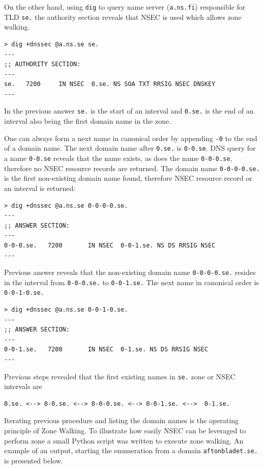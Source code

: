 On the other hand, using \texttt{dig} to query name server (\texttt{a.ns.fi}) responsible for TLD \texttt{se.} the authority section reveals that NSEC is used which allows zone walking.

\begin{verbatim}
> dig +dnssec @a.ns.se se.
---
;; AUTHORITY SECTION:
---
se.   7200	   IN NSEC 	0.se. NS SOA TXT RRSIG NSEC DNSKEY
---
\end{verbatim}

In the previous answer \texttt{se.} is the start of an interval and \texttt{0.se.} is the end of an interval also being the first domain name in the zone.

One can always form a next name in canonical order by appending \texttt{-0} to the end of a domain name. The next domain name after \texttt{0.se.} is \texttt{0-0.se}. DNS query for a name \texttt{0-0.se} reveals that the name exists, as does the name \texttt{0-0-0.se}, therefore no NSEC resource records are returned. The domain name \texttt{0-0-0-0.se.} is the first non-existing domain name found, therefore NSEC resource record or an interval is returned:
\begin{verbatim}
> dig +dnssec @a.ns.se 0-0-0-0.se.
---
;; ANSWER SECTION:
---
0-0-0.se.   7200	   IN NSEC 	0-0-1.se. NS DS RRSIG NSEC
---
\end{verbatim}

Previous answer reveals that the non-existing domain name \texttt{0-0-0-0.se.} resides in the interval from \texttt{0-0-0.se.} to \texttt{0-0-1.se.} The next name in canonical order is \texttt{0-0-1-0.se.}

\begin{verbatim}
> dig +dnssec @a.ns.se 0-0-1-0.se.
---
;; ANSWER SECTION:
---
0-0-1.se.   7200	   IN NSEC 	0-1.se. NS DS RRSIG NSEC
---
\end{verbatim}

Previous steps revealed that the first existing names in \texttt{se.} zone or NSEC intervals are

\begin{verbatim}
0.se. <--> 0-0.se. <--> 0-0-0.se. <--> 0-0-1.se. <-->  0-1.se.
\end{verbatim}

Iterating previous procedure and listing the domain names is the operating principle of Zone Walking. To illustrate how easily NSEC can be leveraged to perform zone a small Python script was written to execute zone walking. An example of an output, starting the enumeration from a domain \texttt{aftonbladet.se.} is presented below.


